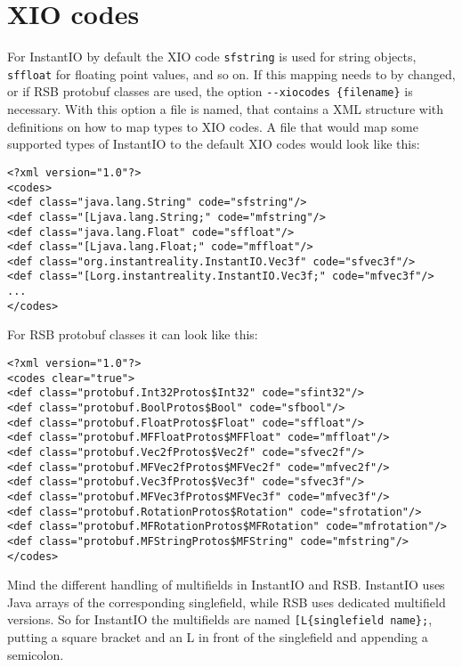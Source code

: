 \documentclass[german,a4paper]{article}
\begin{document}
\section{XIO codes}
\label{sec:xiocodes}

For InstantIO by default the XIO code \texttt{sfstring} is used for string objects, \texttt{sffloat} for floating point values, and so on. If this mapping needs to by changed, or if RSB protobuf classes are used, the option \texttt{-\--xiocodes \{filename\}} is necessary. With this option a file is named, that contains a XML structure with definitions on how to map types to XIO codes. A file that would map some supported types of InstantIO to the default XIO codes would look like this:
\begin{lstlisting}
<?xml version="1.0"?>
<codes>
<def class="java.lang.String" code="sfstring"/>
<def class="[Ljava.lang.String;" code="mfstring"/>
<def class="java.lang.Float" code="sffloat"/>
<def class="[Ljava.lang.Float;" code="mffloat"/>
<def class="org.instantreality.InstantIO.Vec3f" code="sfvec3f"/>
<def class="[Lorg.instantreality.InstantIO.Vec3f;" code="mfvec3f"/>
...
</codes>
\end{lstlisting}

For RSB protobuf classes it can look like this:

\begin{lstlisting}
<?xml version="1.0"?>
<codes clear="true">
<def class="protobuf.Int32Protos$Int32" code="sfint32"/>
<def class="protobuf.BoolProtos$Bool" code="sfbool"/>
<def class="protobuf.FloatProtos$Float" code="sffloat"/>
<def class="protobuf.MFFloatProtos$MFFloat" code="mffloat"/>
<def class="protobuf.Vec2fProtos$Vec2f" code="sfvec2f"/>
<def class="protobuf.MFVec2fProtos$MFVec2f" code="mfvec2f"/>
<def class="protobuf.Vec3fProtos$Vec3f" code="sfvec3f"/>
<def class="protobuf.MFVec3fProtos$MFVec3f" code="mfvec3f"/>
<def class="protobuf.RotationProtos$Rotation" code="sfrotation"/>
<def class="protobuf.MFRotationProtos$MFRotation" code="mfrotation"/>
<def class="protobuf.MFStringProtos$MFString" code="mfstring"/>
</codes>
\end{lstlisting}

Mind the different handling of multifields in InstantIO and RSB. InstantIO uses Java arrays of the corresponding singlefield, while RSB uses dedicated multifield versions. So for InstantIO the multifields are named \texttt{[L\{singlefield name\};}, putting a square bracket and an L in front of the singlefield and appending a semicolon.
\end{document}
